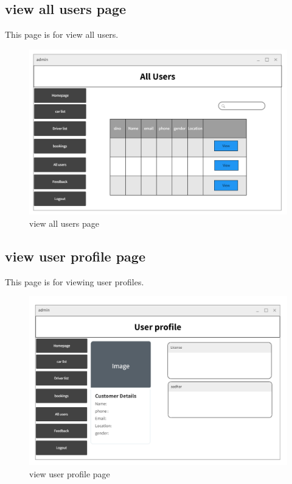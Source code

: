 \documentclass[a4paper,12pt,toc=flat]{report}
\begin{document}
	\pagebreak
	
	
		\subsection{ view all users page}
\hspace*{12pt}
	This page is for view  all users.
	\begin{figure}[bph]
	\begin{center}
		\includegraphics[width=1.1 \linewidth, height=0.7\textheight]{"admin_allusers.png"}
	\end{center}
		\caption{ view all users page}
	\end{figure}

	\pagebreak
	
	
	
			\subsection{ view user profile page}
\hspace*{12pt}
	This page is for viewing user profiles.
	\begin{figure}[bph]
	\begin{center}
		\includegraphics[width=1.1 \linewidth, height=0.7\textheight]{"admin_user.png"}
	\end{center}
		\caption{ view user profile page}
	\end{figure}
\end{document}
